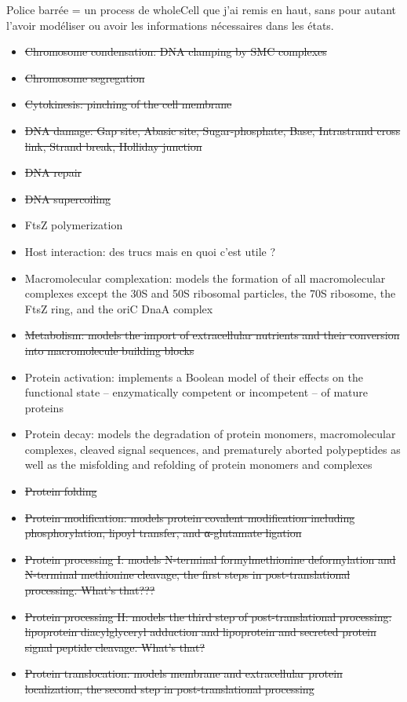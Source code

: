 Police barr\'{e}e = un process de wholeCell que j'ai remis en haut, sans pour autant l'avoir mod\'{e}liser ou avoir les informations n\'{e}cessaires dans les \'{e}tats.
\begin{itemize}
  \item \sout{Chromosome condensation: DNA clamping by SMC complexes}
  \item \sout{Chromosome segregation}
  \item \sout{Cytokinesis: pinching of the cell membrane}
  \item \sout{DNA damage: Gap site, Abasic site, Sugar-phosphate, Base, Intrastrand cross link, Strand break, Holliday junction}
  \item \sout{DNA repair}
  \item \sout{DNA supercoiling}
  \item FtsZ polymerization
  \item Host interaction: des trucs mais en quoi c'est utile ?
  \item Macromolecular complexation: models the formation of all macromolecular complexes except the 30S and 50S ribosomal particles, the 70S ribosome, the FtsZ ring, and the oriC DnaA complex
  \item \sout{Metabolism: models the import of extracellular nutrients and their conversion into macromolecule building blocks}
  \item Protein activation:  implements a Boolean model of their effects on the functional state – enzymatically competent or incompetent – of mature proteins
  \item Protein decay: models the degradation of protein monomers, macromolecular complexes, cleaved signal sequences, and prematurely aborted polypeptides as well as the misfolding and refolding of protein monomers and complexes
  \item \sout{Protein folding}
  \item \sout{Protein modification: models protein covalent modification including phosphorylation, lipoyl transfer, and α-glutamate ligation}
  \item \sout{Protein processing I: models N-terminal formylmethionine deformylation and N-terminal methionine cleavage, the first steps in post-translational processing. What's that???}
  \item \sout{Protein processing II: models the third step of post-translational processing: lipoprotein diacylglyceryl adduction and lipoprotein and secreted protein signal peptide cleavage. What's that?}
  \item \sout{Protein translocation: models membrane and extracellular protein localization, the second step in post-translational processing}

\end{itemize}
